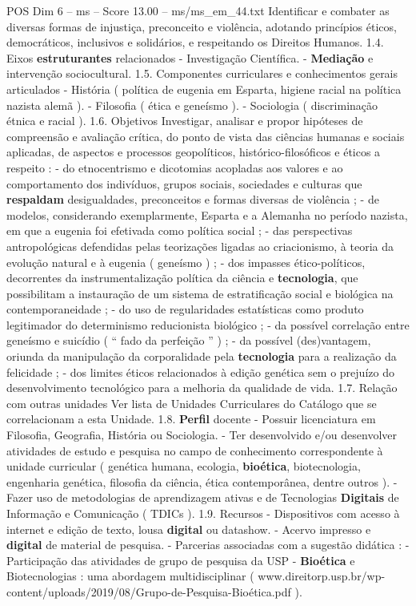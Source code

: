 \begin{textsample}{POS Dim 6 – ms – Score 13.00 – ms/ms\_em\_44.txt}
Identificar e combater as diversas formas de injustiça, preconceito e violência, adotando princípios éticos, democráticos, inclusivos e solidários, e respeitando os Direitos Humanos. 1.4.
Eixos \textbf{estruturantes} relacionados - Investigação Científica. - \textbf{Mediação} e intervenção sociocultural. 1.5.
Componentes curriculares e conhecimentos gerais articulados - História ( política de eugenia em Esparta, higiene racial na política nazista alemã ). - Filosofia ( ética e geneísmo ). - Sociologia ( discriminação étnica e racial ). 1.6.
Objetivos Investigar, analisar e propor hipóteses de compreensão e avaliação crítica, do ponto de vista das ciências humanas e sociais aplicadas, de aspectos e processos geopolíticos, histórico-filosóficos e éticos a respeito : - do etnocentrismo e dicotomias acopladas aos valores e ao comportamento dos indivíduos, grupos sociais, sociedades e culturas que \textbf{respaldam} desigualdades, preconceitos e formas diversas de violência ; - de modelos, considerando exemplarmente, Esparta e a Alemanha no período nazista, em que a eugenia foi efetivada como política social ; - das perspectivas antropológicas defendidas pelas teorizações ligadas ao criacionismo, à teoria da evolução natural e à eugenia ( geneísmo ) ; - dos impasses ético-políticos, decorrentes da instrumentalização política da ciência e \textbf{tecnologia}, que possibilitam a instauração de um sistema de estratificação social e biológica na contemporaneidade ; - do uso de regularidades estatísticas como produto legitimador do determinismo reducionista biológico ; - da possível correlação entre geneísmo e suicídio ( “ fado da perfeição ” ) ; - da possível (des)vantagem, oriunda da manipulação da corporalidade pela \textbf{tecnologia} para a realização da felicidade ; - dos limites éticos relacionados à edição genética sem o prejuízo do desenvolvimento tecnológico para a melhoria da qualidade de vida. 1.7.
Relação com outras unidades Ver lista de Unidades Curriculares do Catálogo que se correlacionam a esta Unidade. 1.8. \textbf{Perfil} docente - Possuir licenciatura em Filosofia, Geografia, História ou Sociologia. - Ter desenvolvido e/ou desenvolver atividades de estudo e pesquisa no campo de conhecimento correspondente à unidade curricular ( genética humana, ecologia, \textbf{bioética}, biotecnologia, engenharia genética, filosofia da ciência, ética contemporânea, dentre outros ). - Fazer uso de metodologias de aprendizagem ativas e de Tecnologias \textbf{Digitais} de Informação e Comunicação ( TDICs ). 1.9.
Recursos - Dispositivos com acesso à internet e edição de texto, lousa \textbf{digital} ou datashow. - Acervo impresso e \textbf{digital} de material de pesquisa. - Parcerias associadas com a sugestão didática : - Participação das atividades de grupo de pesquisa da USP - \textbf{Bioética} e Biotecnologias : uma abordagem multidisciplinar ( www.direitorp.usp.br/wp-content/uploads/2019/08/Grupo-de-Pesquisa-Bioética.pdf ).

\end{textsample}
